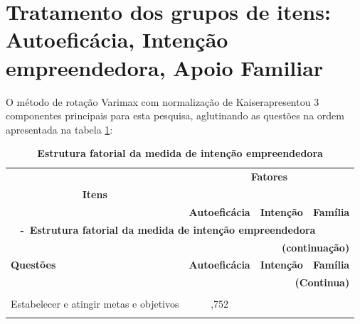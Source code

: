 \section{Tratamento dos grupos de itens: Autoeficácia, Intenção empreendedora, Apoio Familiar}

O método de rotação Varimax com normalização de Kaiser\footnotemark[1] apresentou 3 componentes principais para esta pesquisa, aglutinando as questões na ordem apresentada na tabela \ref{tabela_3}:


\begin{center}

\begin{longtable}{p{6cm} c c c }

\caption{\textbf{Estrutura fatorial da medida de intenção empreendedora}}

\label{tabela_3} \\ \hline\hline

\multicolumn{1}{p{6cm}}{} & \multicolumn{3}{c}{\textbf{Fatores}}\\ 
 \multicolumn{1}{c}{\textbf{Itens}} & \multicolumn{3}{c}{\hrulefill}\\ 

 \multicolumn{1}{c}{} 
 &\multicolumn{1}{p{1.5cm}}{\textbf{Autoeficácia}} & \multicolumn{1}{p{1.5cm}}{\textbf{Intenção}} &\multicolumn{1}{p{1.5cm}}{\textbf{Família}}  
\\ \hline 

\endfirsthead


\multicolumn{4}{l}{{{\bfseries \tablename \ \thetable{} -\ \textbf{Estrutura fatorial da medida de intenção empreendedora}}}}\\
\multicolumn{4}{r}{\bfseries \textbf{(continuação)}}\\

\hline \multicolumn{1}{p{6cm}}{\textbf{Questões}} &\multicolumn{1}{c}{\textbf{Autoeficácia}} & \multicolumn{1}{c}{\textbf{Intenção}} &\multicolumn{1}{c}{\textbf{Família}}  
\\ \hline 

\endhead

\hline \multicolumn{4}{r}{\textbf{(Continua)}} \\ \hline


\endfoot
\hline \multicolumn{4}{r}{\textbf{(Conclusão)}} \\ \hline
\hline \hline

\endlastfoot


Estabelecer e atingir metas e objetivos
 &  ,752 & & \\\\
 

\end{longtable}
\end{center}
